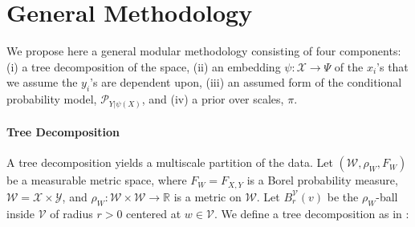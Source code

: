 \documentclass{article} %
\newcommand{\Real}{\mathbb{R}}
\providecommand{\mc}[1]{\mathcal{#1}}
\newcommand{\from}{{\ensuremath{\colon}}}  %
\begin{document}
\section{General Methodology} \label{sec:method}

We propose here a general modular methodology consisting of four components: (i) a tree decomposition of the space, (ii) an embedding $\psi \from \mc{X} \to \Psi$ of the $x_i$'s that we assume the $y_i$'s are dependent upon, (iii) an assumed form of the conditional probability model, $\mc{P}_{Y|\psi(X)}$, and (iv) a prior over scales, $\pi$.

\paragraph{Tree Decomposition}
A tree decomposition yields a multiscale partition of the data.  Let $(\mc{W},\rho_W, F_W)$ be a measurable metric space, where $F_W=F_{X,Y}$ is a Borel probability measure, $\mc{W}=\mc{X} \times \mc{Y}$, and $\rho_W \from \mc{W} \times \mc{W} \to \Real$ is a metric on $\mc{W}$.  Let $B_r^{\mc{V}}(v)$ be the $\rho_W$-ball inside $\mc{V}$ of radius $r > 0$ centered at $w \in \mc{V}$. We define a tree decomposition as in \cite{Allard2012}:
\end{document}
